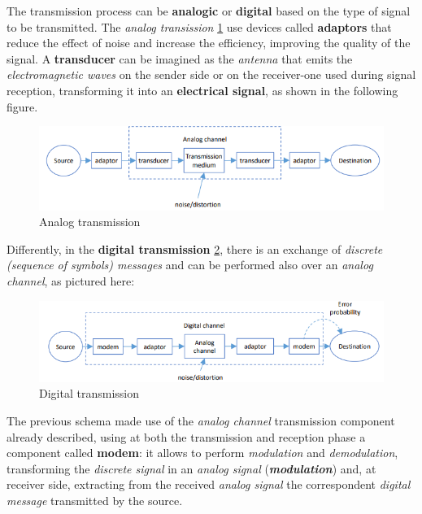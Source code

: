 \documentclass[10pt,a4paper]{report}
\theoremstyle{definition}
\begin{document}
The transmission process can be \textbf{analogic} or \textbf{digital} based on the type of signal to be transmitted.
The \textit{analog transission} \ref{analog-trans} use devices called \textbf{adaptors} that reduce the effect of noise and increase the efficiency, improving the quality of the signal. A \textbf{transducer} can be imagined as the \textit{antenna} that emits the \textit{electromagnetic waves} on the sender side or on the receiver-one used during signal reception, transforming it into an \textbf{electrical signal}, as shown in the following figure.
\begin{figure}[h]
	\centering\includegraphics[scale=0.50]{images/Pasted image 20230505120141.png}
	\caption{Analog transmission}
	\label{analog-trans}
\end{figure}


Differently, in the \textbf{digital transmission} \ref{digital-trans}, there is an exchange of \textit{discrete (sequence of symbols) messages} and can be performed also over an \textit{analog channel}, as pictured here:
\begin{figure}[h]
	\centering\includegraphics[scale=0.50]{images/Pasted image 20230505120531.png}
	\caption{Digital transmission}
	\label{digital-trans}
\end{figure}

The previous schema made use of the \textit{analog channel} transmission component already described, using at both the transmission and reception phase a component called \textbf{modem}: it allows to perform \textit{modulation} and \textit{demodulation}, transforming the \textit{discrete signal} in an \textit{analog signal} (\textit{\textbf{modulation}}) and, at receiver side, extracting from the received \textit{analog signal} the correspondent \textit{digital message} transmitted by the source.
\end{document}
